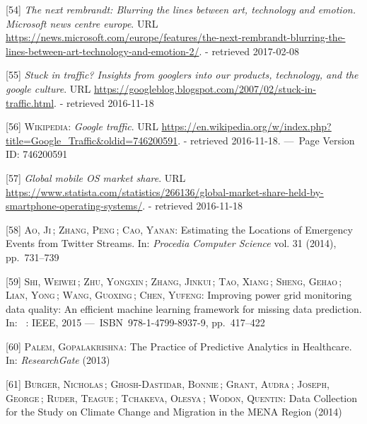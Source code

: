\documentclass[12pt,english,a4paper,titlepage,cleardoublepage=empty,dottedtoc]{report}
\begin{document}
\hypertarget{ref-web_2016_research-experiment_ai-rembrandt}{}
{[}54{]} \emph{The next rembrandt: Blurring the lines between art,
technology and emotion. Microsoft news centre europe}. URL
\url{https://news.microsoft.com/europe/features/the-next-rembrandt-blurring-the-lines-between-art-technology-and-emotion-2/}.
- retrieved 2017-02-08

\hypertarget{ref-web_2007_introducing-google-traffic}{}
{[}55{]} \emph{Stuck in traffic? Insights from googlers into our
products, technology, and the google culture}. URL
\url{https://googleblog.blogspot.com/2007/02/stuck-in-traffic.html}. -
retrieved 2016-11-18

\hypertarget{ref-web_2016_wikipedia_google-traffic}{}
{[}56{]} \textsc{Wikipedia}: \emph{Google traffic}. URL
\url{https://en.wikipedia.org/w/index.php?title=Google_Traffic\&oldid=746200591}.
- retrieved 2016-11-18. ---~Page Version ID: 746200591

\hypertarget{ref-graphic_2016_global-mobile-os-market-share}{}
{[}57{]} \emph{Global mobile OS market share}. URL
\url{https://www.statista.com/statistics/266136/global-market-share-held-by-smartphone-operating-systems/}.
- retrieved 2016-11-18

\hypertarget{ref-estimating-the-locations-of-emergency-events-from-twitter-streams_2014}{}
{[}58{]} \textsc{Ao, Ji}\,; \textsc{Zhang, Peng}\,; \textsc{Cao, Yanan}:
Estimating the Locations of Emergency Events from Twitter Streams. In:
\emph{Procedia Computer Science} vol. 31 (2014), pp.~731--739

\hypertarget{ref-paper_2015_improving-power-grid-monitoring-data-quality-an-efficient-machine-learning-framework-for-missing-data-prediction}{}
{[}59{]} \textsc{Shi, Weiwei}\,; \textsc{Zhu, Yongxin}\,; \textsc{Zhang,
Jinkui}\,; \textsc{Tao, Xiang}\,; \textsc{Sheng, Gehao}\,; \textsc{Lian,
Yong}\,; \textsc{Wang, Guoxing}\,; \textsc{Chen, Yufeng}: Improving
power grid monitoring data quality: An efficient machine learning
framework for missing data prediction. In: ~: IEEE, 2015
---~ISBN~978-1-4799-8937-9, pp.~417--422

\hypertarget{ref-the-practice-of-predictive-analytics-in-healthcare_2013}{}
{[}60{]} \textsc{Palem, Gopalakrishna}: The Practice of Predictive
Analytics in Healthcare. In: \emph{ResearchGate} (2013)

\hypertarget{ref-data-collection-for-climate-changes_2014}{}
{[}61{]} \textsc{Burger, Nicholas}\,; \textsc{Ghosh-Dastidar, Bonnie}\,;
\textsc{Grant, Audra}\,; \textsc{Joseph, George}\,; \textsc{Ruder,
Teague}\,; \textsc{Tchakeva, Olesya}\,; \textsc{Wodon, Quentin}: Data
Collection for the Study on Climate Change and Migration in the MENA
Region (2014)
\end{document}
